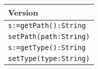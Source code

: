 \documentclass[12pt]{article}
\begin{document}
\begin{tabular}{| l |}
    \hline
    Version\\
    \hline
    \texttt{s:=getPath():String}\\
    \texttt{setPath(path:String)}\\
    \texttt{s:=getType():String}\\
    \texttt{setType(type:String)}\\
    \hline
    
\end{tabular}
\vspace{1cm}
\end{document}
